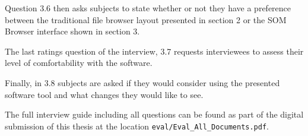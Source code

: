 \par
Question 3.6 then asks subjects to state whether or not they have a preference
between the traditional file browser layout presented in section 2 or the SOM
Browser interface shown in section 3.

\par
The last ratings question of the interview, 3.7 requests interviewees to assess
their level of comfortability with the software.

\par
Finally, in 3.8 subjects are asked if they would consider using the presented
software tool and what changes they would like to see.

\bigskip

The full interview guide including all questions can be found as part of the
digital submission of this thesis at the location
\texttt{eval/Eval\_All\_Documents.pdf}.
